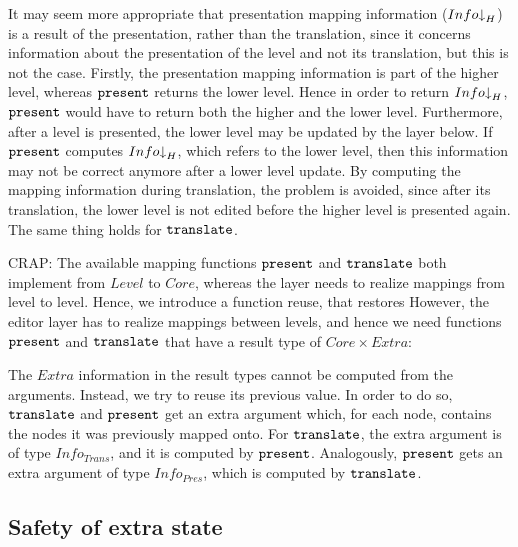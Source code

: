 It may seem more appropriate that presentation mapping information ($Info\idwn_{H}$) is a result of the presentation, rather than the translation, since it concerns information about the presentation of the level and not its translation, but this is not the case. Firstly, the presentation mapping information is part of the higher level, whereas ${\tt present}$ returns the lower level. Hence in order to return $Info\idwn_{H}$, ${\tt present}$ would have to return both the higher and the lower level.  Furthermore, after a level is presented, the lower level may be updated by the layer below. If ${\tt present}$ computes $Info\idwn_{H}$, which refers to the lower level, then this information may not be correct anymore after a lower level update. By computing the mapping information during translation, the problem is avoided, since after its translation, the lower level is not edited before the higher level is presented again. The same thing holds for ${\tt translate}$.



\bc CRAP:
The available mapping functions ${\tt present}$ and ${\tt translate}$ both implement from $Level$ to $Core$, whereas the layer needs to realize mappings from level to level. Hence, we introduce a function reuse, that restores However, the editor layer has to realize mappings between levels, and hence we need functions ${\tt present}$ and ${\tt translate}$ that have a result type of $Core \times Extra$:

The $Extra$ information in the result types cannot be computed from the arguments. Instead, we try to reuse its previous value. In order to do so, ${\tt translate}$ and ${\tt present}$ get an extra argument which, for each node, contains the nodes it was previously mapped onto. For ${\tt translate}$, the extra argument is of type $Info_{Trans}$, and it is computed by ${\tt present}$. Analogously, ${\tt present}$ gets an extra argument of type $Info_{Pres}$, which is computed by ${\tt translate}$. 
\ec

%																
\subsection{Safety of extra state}

